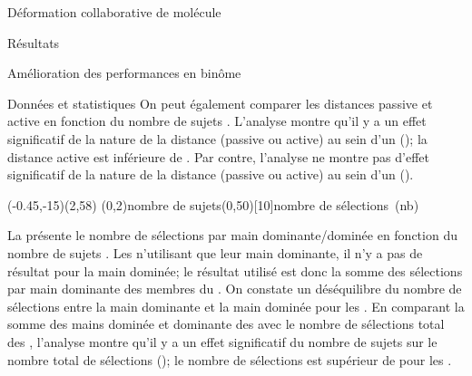 \documentclass[myfrancais,ngerman,english,french]{mythesis}
\begin{document}
\begin{mychapter}{Déformation collaborative de molécule}
\begin{mysection}{Résultats}
\begin{mysubsection}{Amélioration des performances en binôme}
\begin{mysubsubsection}{Données et statistiques}
					On peut également comparer les distances passive et active en fonction du nombre de sujets .
					L'analyse montre qu'il y a un effet significatif de la nature de la distance (passive ou active) au sein d'un  (); la distance active est inférieure de .
					Par contre, l'analyse ne montre pas d'effet significatif de la nature de la distance (passive ou active) au sein d'un  ().

					\begin{myfigure}
						\begin{myps}(-0.45,-15)(2,58)
							\myaxes(0,2){nombre de sujets}(0,50)[10]{nombre de sélections~(nb)}
						\end{myps}
					\end{myfigure}

					La  présente le nombre de sélections par main dominante/dominée  en fonction du nombre de sujets .
					Les  n'utilisant que leur main dominante, il n'y a pas de résultat pour la main dominée; le résultat utilisé est donc la somme des sélections par main dominante des membres du .
					On constate un déséquilibre du nombre de sélections entre la main dominante et la main dominée pour les .
					En comparant la somme des mains dominée et dominante des  avec le nombre de sélections total des , l'analyse montre qu'il y a un effet significatif du nombre de sujets  sur le nombre total de sélections  (); le nombre de sélections est supérieur de  pour les .


\end{mysubsubsection}
\end{mysubsection}
\end{mysection}
\end{mychapter}
\end{document}
